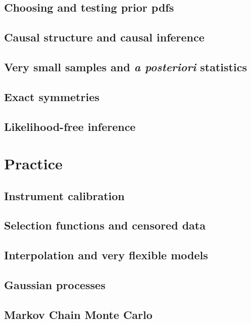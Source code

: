 \documentclass[10pt]{book}
\newcommand{\foreign}[1]{{\slshape #1}}
\begin{document}
\chapter{Choosing and testing prior pdfs}

\chapter{Causal structure and causal inference}

\chapter{Very small samples and \foreign{a posteriori} statistics}

\chapter{Exact symmetries}\label{ch:symmetry}

\chapter{Likelihood-free inference}

\part{Practice}

\chapter{Instrument calibration}

\chapter{Selection functions and censored data}

\chapter{Interpolation and very flexible models}\label{ch:flexible}

\chapter{Gaussian processes}

\chapter{Markov Chain Monte Carlo}
\end{document}
